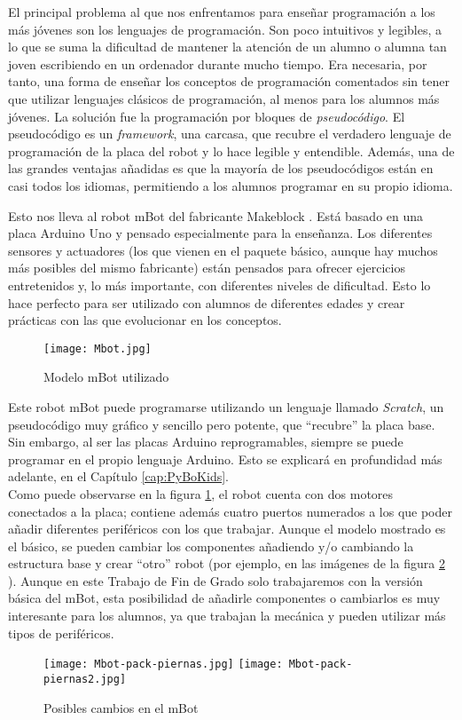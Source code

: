 El principal problema al que nos enfrentamos para enseñar programación a los más jóvenes son los lenguajes de programación. Son poco intuitivos y legibles, a lo que se suma la dificultad de mantener la atención de un alumno o alumna tan joven escribiendo en un ordenador durante mucho tiempo. Era necesaria, por tanto, una forma de enseñar los conceptos de programación comentados sin tener que utilizar lenguajes clásicos de programación, al menos para los alumnos más jóvenes. La solución fue la programación por bloques de \textit{pseudocódigo}. El pseudocódigo es un \textit{framework}, una carcasa, que recubre el verdadero lenguaje de programación de la placa del robot y lo hace legible y entendible. Además, una de las grandes ventajas añadidas es que la mayoría de los pseudocódigos están en casi todos los idiomas, permitiendo a los alumnos programar en su propio idioma. \\
\par Esto nos lleva al robot mBot del fabricante Makeblock \cite{makeblock}. Está basado en una placa Arduino Uno y pensado especialmente para la enseñanza. Los diferentes sensores y actuadores (los que vienen en el paquete básico, aunque hay muchos más posibles del mismo fabricante) están pensados para ofrecer ejercicios entretenidos y, lo más importante, con diferentes niveles de dificultad. Esto lo hace perfecto para ser utilizado con alumnos de diferentes edades y crear prácticas con las que evolucionar en los conceptos. 
\begin{figure}[H]
	\texttt{[image: Mbot.jpg]}\centering
	\caption{Modelo mBot utilizado}
	\label{img:mbot}
\end{figure}
Este robot mBot puede programarse utilizando un  lenguaje llamado \textit{Scratch},  un pseudocódigo muy gráfico y sencillo pero potente, que ``recubre'' la placa base. Sin embargo, al ser las placas Arduino reprogramables, siempre se puede programar en el propio lenguaje Arduino. Esto  se explicará en profundidad más adelante, en el Capítulo \ref{cap:PyBoKids}. \\

Como puede observarse en la figura \ref{img:mbot}, el robot cuenta con dos motores conectados a la placa; contiene además cuatro puertos numerados a los que poder añadir diferentes periféricos con los que trabajar. Aunque el modelo mostrado es el básico, se pueden cambiar los componentes añadiendo y/o cambiando la estructura base y crear ``otro'' robot (por ejemplo, en las imágenes de la figura \ref{img:mbot2} ). Aunque en este Trabajo de Fin de Grado solo trabajaremos con la versión básica del mBot, esta posibilidad de añadirle componentes o cambiarlos es muy interesante para los alumnos, ya que trabajan la mecánica y pueden utilizar más tipos de periféricos.
\begin{figure}[H]
	\texttt{[image: Mbot-pack-piernas.jpg]}
	\texttt{[image: Mbot-pack-piernas2.jpg]}
	\centering
	\caption{Posibles cambios en el mBot}
	\label{img:mbot2}
\end{figure}
